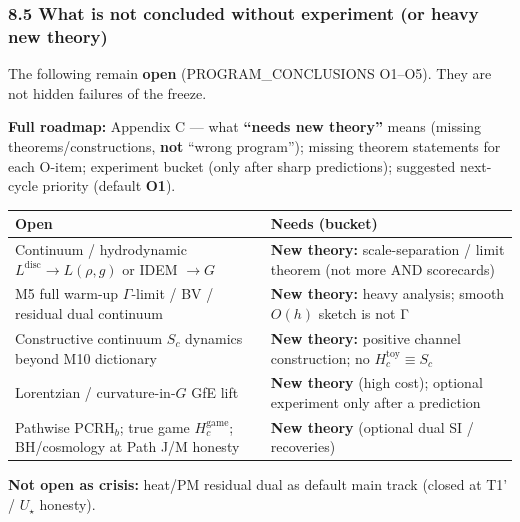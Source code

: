 \documentclass[
  11pt,
]{article}
\newcounter{none} %
\begin{document}
\subsubsection{8.5 What is not concluded without experiment (or heavy
new
theory)}\label{what-is-not-concluded-without-experiment-or-heavy-new-theory}

The following remain \textbf{open} (PROGRAM\_CONCLUSIONS O1--O5). They
are not hidden failures of the freeze.

\textbf{Full roadmap:} Appendix C --- what \textbf{``needs new theory''}
means (missing theorems/constructions, \textbf{not} ``wrong program'');
missing theorem statements for each O-item; experiment bucket (only
after sharp predictions); suggested next-cycle priority (default
\textbf{O1}).

{\def\LTcaptype{none} %
\begin{longtable}[]{@{}
  >{\raggedright\arraybackslash}p{}
  >{\raggedright\arraybackslash}p{}@{}}
\toprule\noalign{}
\begin{minipage}[b]{\linewidth}\raggedright
Open
\end{minipage} & \begin{minipage}[b]{\linewidth}\raggedright
Needs (bucket)
\end{minipage} \\
\midrule\noalign{}
\endhead
\bottomrule\noalign{}
\endlastfoot
Continuum / hydrodynamic \(L^{\mathrm{disc}}\to L(\rho,g)\) or IDEM
\(\to G\) & \textbf{New theory:} scale-separation / limit theorem (not
more AND scorecards) \\
M5 full warm-up \(\Gamma\)-limit / BV / residual dual continuum &
\textbf{New theory:} heavy analysis; smooth \(O(h)\) sketch is not Γ \\
Constructive continuum \(S_c\) dynamics beyond M10 dictionary &
\textbf{New theory:} positive channel construction; no
\(H_c^{\mathrm{toy}}\equiv S_c\) \\
Lorentzian / curvature-in-\(G\) GfE lift & \textbf{New theory} (high
cost); optional experiment only after a prediction \\
Pathwise PCRH\(_b\); true game \(H_c^{\mathrm{game}}\); BH/cosmology at
Path J/M honesty & \textbf{New theory} (optional dual SI /
recoveries) \\
\end{longtable}
}

\textbf{Not open as crisis:} heat/PM residual dual as default main track
(closed at T1' / \(U_\star\) honesty).
\end{document}
